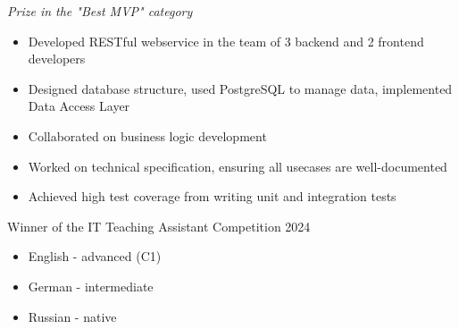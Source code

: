 \documentclass[10pt,a4paper,ragged2e,withhyper]{altacv}
\begin{document}
\begin{paracol}{2}
\textit{Prize in the "Best MVP" category}
\begin{itemize}
  \item Developed RESTful webservice in the team of 3 backend and 2 frontend developers
  \item Designed database structure, used PostgreSQL to manage data, implemented Data Access Layer
  \item Collaborated on business logic development
  \item Worked on technical specification, ensuring all usecases are well-documented
  \item Achieved high test coverage from writing unit and integration tests
\end{itemize}


\divider
{}
Winner of the IT Teaching Assistant Competition 2024

\switchcolumn






\medskip




\medskip







\begin{itemize}
\item English - advanced (C1)
\item German - intermediate
\item Russian - native
\end{itemize}


\end{paracol}
\end{document}
